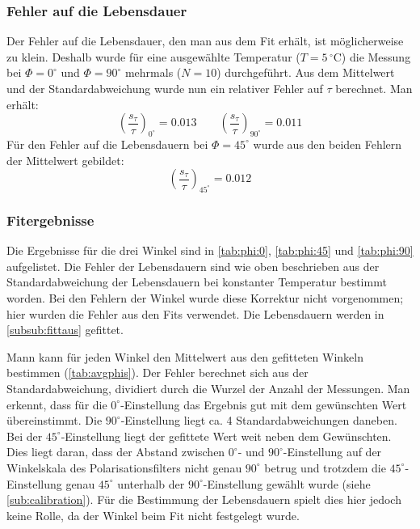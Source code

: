 \subsubsection{Fehler auf die Lebensdauer}
Der Fehler auf die Lebensdauer, den man aus dem Fit erhält, ist möglicherweise zu klein. Deshalb wurde für eine ausgewählte Temperatur ($T=5\,{}^\circ$C) 
die Messung bei $\Phi=0^\circ$ und $\Phi=90^\circ$ mehrmals ($N=10$) durchgeführt. Aus dem Mittelwert und der Standardabweichung wurde 
nun ein relativer Fehler auf $\tau$ berechnet. Man erhält:
\begin{equation}
  \label{eq:error:tau:0_90}
  \left( \frac{s_\tau}{\tau} \right)_{0^\circ} = 0.013 \qquad \left( \frac{s_\tau}{\tau} \right)_{90^\circ} = 0.011
\end{equation}
Für den Fehler auf die Lebensdauern bei $\Phi=45^\circ$ wurde aus den beiden Fehlern der Mittelwert gebildet:
\begin{equation}
  \label{eq:error:tau:45}
  \left( \frac{s_\tau}{\tau} \right)_{45^\circ} = 0.012
\end{equation}
\subsubsection{Fitergebnisse}
\label{subsub:fitresults}
Die Ergebnisse für die drei Winkel sind in \autoref{tab:phi:0}, \autoref{tab:phi:45} und \autoref{tab:phi:90} aufgelistet. Die Fehler der 
Lebensdauern sind wie oben beschrieben aus der Standardabweichung der Lebensdauern bei konstanter Temperatur bestimmt worden. Bei den Fehlern 
der Winkel wurde diese Korrektur nicht vorgenommen; hier wurden die Fehler aus den Fits verwendet. Die Lebensdauern werden in 
\ref{subsub:fittaus} gefittet.




Mann kann für jeden Winkel den Mittelwert aus den gefitteten Winkeln bestimmen (\autoref{tab:avgphis}). Der Fehler berechnet sich aus der 
Standardabweichung, dividiert durch die Wurzel der Anzahl der Messungen. Man erkennt, dass für die $0^\circ$-Einstellung das Ergebnis gut mit dem 
gewünschten Wert übereinstimmt. Die $90^\circ$-Einstellung liegt ca. 4 Standardabweichungen daneben. Bei der $45^\circ$-Einstellung liegt der 
gefittete Wert weit neben dem Gewünschten. Dies liegt daran, dass der Abstand zwischen $0^\circ$- und $90^\circ$-Einstellung auf der Winkelskala 
des Polarisationsfilters nicht genau $90^\circ$ betrug und trotzdem die $45^\circ$-Einstellung genau $45^\circ$ unterhalb der $90^\circ$-Einstellung 
gewählt wurde (siehe \ref{sub:calibration}). Für die Bestimmung der Lebensdauern spielt dies hier jedoch keine Rolle, da der Winkel beim Fit 
nicht festgelegt wurde.


